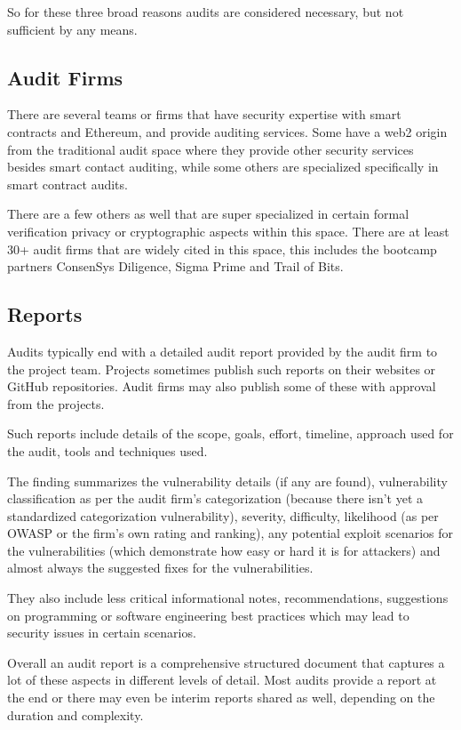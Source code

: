 So for these three broad reasons audits are considered necessary, but
not sufficient by any means.

\subsection{Audit Firms}\label{audit-firms}

There are several teams or firms that have security expertise with smart
contracts and Ethereum, and provide auditing services. Some have a web2
origin from the traditional audit space where they provide other
security services besides smart contact auditing, while some others are
specialized specifically in smart contract audits.

There are a few others as well that are super specialized in certain
formal verification privacy or cryptographic aspects within this space.
There are at least 30+ audit firms that are widely cited in this space,
this includes the bootcamp partners ConsenSys Diligence, Sigma Prime and
Trail of Bits.

\subsection{Reports}\label{reports}

Audits typically end with a detailed audit report provided by the audit
firm to the project team. Projects sometimes publish such reports on
their websites or GitHub repositories. Audit firms may also publish some
of these with approval from the projects.

Such reports include details of the scope, goals, effort, timeline,
approach used for the audit, tools and techniques used.

The finding summarizes the vulnerability details (if any are found),
vulnerability classification as per the audit firm's categorization
(because there isn't yet a standardized categorization vulnerability),
severity, difficulty, likelihood (as per OWASP or the firm's own rating
and ranking), any potential exploit scenarios for the vulnerabilities
(which demonstrate how easy or hard it is for attackers) and almost
always the suggested fixes for the vulnerabilities.

They also include less critical informational notes, recommendations,
suggestions on programming or software engineering best practices which
may lead to security issues in certain scenarios.

Overall an audit report is a comprehensive structured document that
captures a lot of these aspects in different levels of detail. Most
audits provide a report at the end or there may even be interim reports
shared as well, depending on the duration and complexity.

